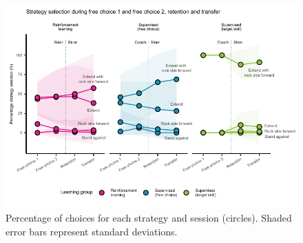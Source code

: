 \documentclass[pdflatex,sn-nature]{sn-jnl}%
\theoremstyle{thmstyleone}%
\theoremstyle{thmstyletwo}%
\theoremstyle{thmstylethree}%
\begin{document}
\begin{figure}[H]
\centering
\includegraphics{figures/figure_choice_descriptivecount_4.pdf}
\caption{Percentage of choices for each strategy and session (circles). Shaded error bars represent standard deviations. }\label{fig: choice_descriptives}
\end{figure}
\end{document}
